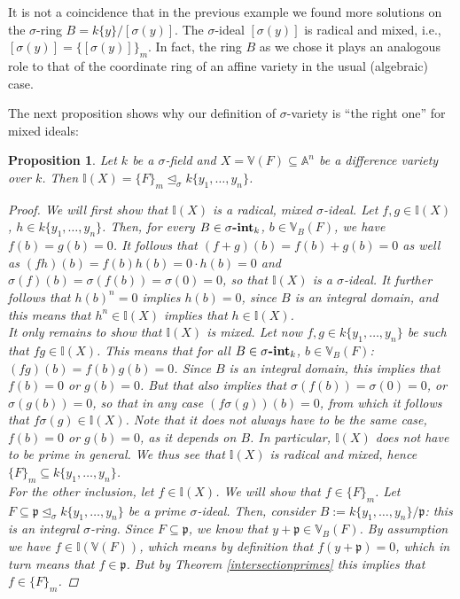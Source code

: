 \documentclass{article}
\def\I{\mathbb{I}}
\def\VV{\mathbb{V}}
\def\p{\mathfrak{p}}
\def\s{\sigma}
\def\si{\unlhd_{\sigma}}
\newcommand{\catname}[1]{{\normalfont\textbf{#1}}}
\newcommand{\sintk}{\s\text{\catname{-int}}_k}
\newenvironment{bew}{\begin{proof}[Proof]}{\end{proof}}
\theoremstyle{plain}
\newtheorem{prop}[Satz]{Proposition}
\theoremstyle{definition}
\begin{document}
It is not a coincidence that in the previous example we found more solutions on the $\s$-ring $B = k\{y\}/[\s(y)]$. The $\s$-ideal $[\s(y)]$ is radical and mixed, i.e., $[\s(y)] = \{ [\s(y)] \}_m$.
In fact, the ring $B$ as we chose it plays an analogous role to that of the coordinate ring of an affine variety in the usual (algebraic) case.

The next proposition shows why our definition of $\s$-variety is ``the right one'' for mixed ideals:

\begin{prop}\label{I=F_m}
Let $k$ be a $\s$-field and $X = \VV(F) \subseteq \mathbb{A}^n$ be a difference variety over $k$. Then $\I(X) = \{F\}_m \si k\{y_1,\ldots,y_n\}$. 
\begin{bew}
We will first show that $\I(X)$ is a radical, mixed $\s$-ideal.
Let $f, g \in \I(X)$, $h \in k\{y_1,\ldots,y_n\}$. Then, for every $B \in \sintk$, $b \in \VV_B(F)$, we have $f(b) = g(b) = 0$.
It follows that $(f + g)(b) = f(b) + g(b) = 0$ as well as $(fh)(b) = f(b)h(b) = 0 \cdot h(b) = 0$ and $\s(f)(b) = \s(f(b)) = \s(0) = 0$, so that $\I(X)$ is a $\s$-ideal.
It further follows that $h(b)^n = 0$ implies $h(b) = 0$, since $B$ is an integral domain, and this means that $h^n \in \I(X)$ implies that $ h \in \I(X)$. \\
\indent It only remains to show that $\I(X)$ is mixed. Let now $f,g \in k\{y_1,\ldots,y_n\}$ be such that $fg \in \I(X)$. This means that for all  $B \in \sintk$, $b \in \VV_B(F)$: $(fg)(b) = f(b) g(b) = 0$. Since $B$ is an integral domain,
this implies that $f(b) = 0$ or $g(b) = 0$. But that also implies that $\s(f(b)) = \s(0) = 0$, or $\s(g(b)) = 0$, so that in any case $(f\s(g))(b) = 0$, from which it follows that $f\s(g) \in \I(X)$.
Note that it does not always have to be the same case, $f(b) = 0$ or $g(b) = 0$, as it depends on $B$. In particular, $\I(X)$ does not have to be prime in general. We thus see that $\I(X)$ is radical and mixed, hence $\{F\}_m \subseteq k\{y_1,\ldots,y_n\}$. \\
\indent For the other inclusion, let $f \in \I(X)$. We will show that $f \in \{F\}_m$. Let $F \subseteq \p \si k\{y_1,\ldots,y_n\}$ be a prime $\s$-ideal.
Then, consider $B:= k\{y_1,\ldots,y_n\}/\p$: this is an integral $\s$-ring. Since $F \subseteq \p$, we know that $y + \p \in \VV_B(F)$. By assumption we have $f \in \I(\VV(F))$, which means by definition that $f(y + \p) = 0$, which
in turn means that $f \in \p$. But by Theorem \ref{intersectionprimes} this implies that $f \in \{F\}_m$.
\end{bew}
\end{prop}
\end{document}
